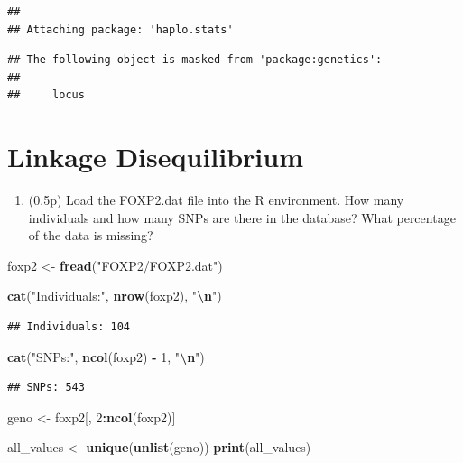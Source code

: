 \documentclass[
]{article}
\newenvironment{Shaded}{\begin{snugshade}}{\end{snugshade}}
\newcommand{\DecValTok}[1]{\textcolor[rgb]{0.00,0.00,0.81}{#1}}
\newcommand{\FunctionTok}[1]{\textcolor[rgb]{0.13,0.29,0.53}{\textbf{#1}}}
\newcommand{\NormalTok}[1]{#1}
\newcommand{\OtherTok}[1]{\textcolor[rgb]{0.56,0.35,0.01}{#1}}
\newcommand{\SpecialCharTok}[1]{\textcolor[rgb]{0.81,0.36,0.00}{\textbf{#1}}}
\newcommand{\StringTok}[1]{\textcolor[rgb]{0.31,0.60,0.02}{#1}}
\providecommand{\tightlist}{%
  \setlength{\itemsep}{0pt}\setlength{\parskip}{0pt}}
\begin{document}
\begin{verbatim}
## 
## Attaching package: 'haplo.stats'
\end{verbatim}

\begin{verbatim}
## The following object is masked from 'package:genetics':
## 
##     locus
\end{verbatim}

\section{Linkage Disequilibrium}\label{linkage-disequilibrium}

\begin{enumerate}
\def\labelenumi{\arabic{enumi}.}
\tightlist
\item
  (0.5p) Load the FOXP2.dat file into the R environment. How many
  individuals and how many SNPs are there in the database? What
  percentage of the data is missing?
\end{enumerate}

\begin{Shaded}
\begin{Highlighting}[]
\NormalTok{foxp2 }\OtherTok{\textless{}{-}} \FunctionTok{fread}\NormalTok{(}\StringTok{"FOXP2/FOXP2.dat"}\NormalTok{)}

\FunctionTok{cat}\NormalTok{(}\StringTok{"Individuals:"}\NormalTok{, }\FunctionTok{nrow}\NormalTok{(foxp2), }\StringTok{"}\SpecialCharTok{\textbackslash{}n}\StringTok{"}\NormalTok{)}
\end{Highlighting}
\end{Shaded}

\begin{verbatim}
## Individuals: 104
\end{verbatim}

\begin{Shaded}
\begin{Highlighting}[]
\FunctionTok{cat}\NormalTok{(}\StringTok{"SNPs:"}\NormalTok{, }\FunctionTok{ncol}\NormalTok{(foxp2) }\SpecialCharTok{{-}} \DecValTok{1}\NormalTok{, }\StringTok{"}\SpecialCharTok{\textbackslash{}n}\StringTok{"}\NormalTok{)}
\end{Highlighting}
\end{Shaded}

\begin{verbatim}
## SNPs: 543
\end{verbatim}

\begin{Shaded}
\begin{Highlighting}[]
\NormalTok{geno }\OtherTok{\textless{}{-}}\NormalTok{ foxp2[, }\DecValTok{2}\SpecialCharTok{:}\FunctionTok{ncol}\NormalTok{(foxp2)]}

\NormalTok{all\_values }\OtherTok{\textless{}{-}} \FunctionTok{unique}\NormalTok{(}\FunctionTok{unlist}\NormalTok{(geno))}
\FunctionTok{print}\NormalTok{(all\_values)}
\end{Highlighting}
\end{Shaded}
\end{document}
